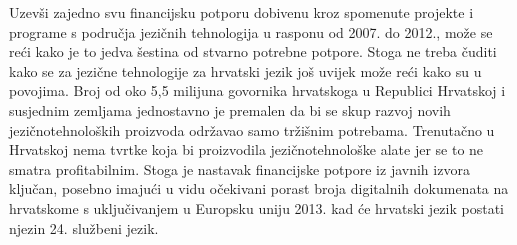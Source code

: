 \begin{multicols}{2}
Uzevši zajedno svu financijsku potporu dobivenu kroz spomenute projekte i programe s područja jezičnih tehnologija u rasponu od 2007. do 2012., može se reći kako je to jedva šestina od stvarno potrebne potpore. Stoga ne treba čuditi kako se za jezične tehnologije za hrvatski jezik još uvijek može reći kako su u povojima. Broj od oko 5,5 milijuna govornika hrvatskoga u Republici Hrvatskoj i susjednim zemljama jednostavno je premalen da bi se skup razvoj novih jezičnotehnoloških proizvoda održavao samo tržišnim potrebama. Trenutačno u Hrvatskoj nema tvrtke koja bi proizvodila jezičnotehnološke alate jer se to ne smatra profitabilnim. Stoga je nastavak financijske potpore iz javnih izvora ključan, posebno imajući u vidu očekivani porast broja digitalnih dokumenata na hrvatskome s uključivanjem u Europsku uniju 2013. kad će hrvatski jezik postati njezin 24. službeni jezik.


\end{multicols}

